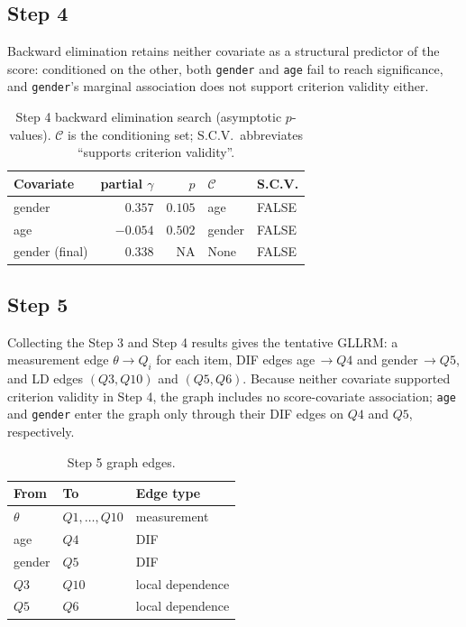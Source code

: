 \documentclass[12pt]{article}
\theoremstyle{examplestyle}
\begin{document}
\subsection{Step 4}
Backward elimination retains neither covariate as a structural predictor of the score: conditioned on the other, both \texttt{gender} and \texttt{age} fail to reach significance, and \texttt{gender}'s marginal association does not support criterion validity either.
\begin{table}[H]
\centering
\begin{tabular}{@{}lrrll@{}}
\toprule
Covariate & partial $\gamma$ & $p$ & $\mathcal{C}$ & S.C.V. \\
\midrule
gender & $0.357$ & $0.105$ & age & FALSE \\
age & $-0.054$ & $0.502$ & gender & FALSE \\
\midrule
gender (final) & $0.338$ & NA & None & FALSE \\
\bottomrule
\end{tabular}
\caption{Step 4 backward elimination search (asymptotic $p$-values). $\mathcal{C}$ is the conditioning set; S.C.V.\ abbreviates ``supports criterion validity''.}
\label{tab:ak_step4}
\end{table}

\subsection{Step 5}
Collecting the Step 3 and Step 4 results gives the tentative GLLRM: a measurement edge $\theta\to Q_i$ for each item, DIF edges age$\,\to Q4$ and gender$\,\to Q5$, and LD edges $(Q3,Q10)$ and $(Q5,Q6)$. Because neither covariate supported criterion validity in Step 4, the graph includes no score-covariate association; \texttt{age} and \texttt{gender} enter the graph only through their DIF edges on $Q4$ and $Q5$, respectively.
\begin{table}[H]
\centering
\begin{tabular}{@{}lll@{}}
\toprule
From & To & Edge type \\
\midrule
$\theta$ & $Q1,\dots,Q10$ & measurement \\
age & $Q4$ & DIF \\
gender & $Q5$ & DIF \\
$Q3$ & $Q10$ & local dependence \\
$Q5$ & $Q6$ & local dependence \\
\bottomrule
\end{tabular}
\caption{Step 5 graph edges.}
\label{tab:ak_step5}
\end{table}
\end{document}

